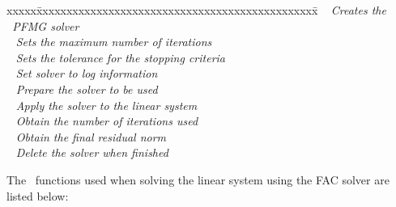 \documentclass[10pt]{article}
\begin{document}
\begin{tabbing}
xxxxx\=xxxxxxxxxxxxxxxxxxxxxxxxxxxxxxxxxxxxxxxxxxxxxxx\=\kill
\> \done\ 
   \> \textit{Creates the \hypre\ PFMG solver} \\
\> \done\ 
   \> \textit{Sets the maximum number of iterations} \\
\> \done\ 
   \> \textit{Sets the tolerance for the stopping criteria} \\
\> \done\ 
   \> \textit{Set solver to log information} \\
\> \done\ 
   \> \textit{Prepare the solver to be used} \\
\> \done\ 
   \> \textit{Apply the solver to the linear system} \\
\> \done\ 
   \> \textit{Obtain the number of iterations used} \\
\> \done\ 
   \> \textit{Obtain the final residual norm} \\
\> \done\ 
   \> \textit{Delete the solver when finished}
\end{tabbing}

The \hypre\ functions used when solving the linear system using
the FAC solver are listed below:
\end{document}
